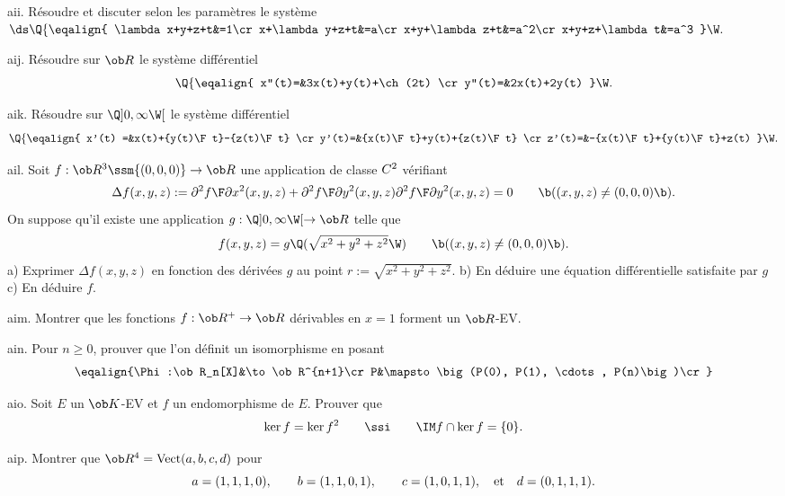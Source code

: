 \exo [Level=1,Fight=1,Learn=1,Field=\DimensionFinie,Type=\Exercices,Origin=]  aii. 
Résoudre et discuter selon les paramètres le système  $\ds
\Q\{\eqalign{
\lambda x+y+z+t&=1\cr
x+\lambda y+z+t&=a\cr
x+y+\lambda z+t&=a^2\cr
x+y+z+\lambda t&=a^3
}\W.$

 

\exo [Level=2,Fight=1,Learn=1,Field=\SystèmesDifférentiels,Type=\Exercices,Origin=] aij. 
Résoudre sur $\ob R$ le système différentiel 
$$ 
\Q\{\eqalign{
x''(t)=&3x(t)+y(t)+\ch (2t)
\cr
y''(t)=&2x(t)+2y(t)
}\W.
$$

\exo [Level=2,Fight=0,Learn=0,Field=\SystèmesDifférentiels,Type=\Exercices,Origin=] aik.  
Résoudre sur $\Q]0,\infty\W[$ le système différentiel 
$$
\Q\{\eqalign{
x'(t)
=&x(t)+{y(t)\F t}-{z(t)\F t}
\cr
y'(t)=&{x(t)\F t}+y(t)+{z(t)\F t}
\cr
z'(t)=&-{x(t)\F t}+{y(t)\F t}+z(t)
}\W.
$$


\exo [Level=2,Fight=2,Learn=2,Field=\EquationsAuxDérivéesPartielles,Type=\Exercices,Origin=] ail.  
Soit $f:\ob R^3\ssm\{(0,0,0)\}\to\ob R$ une application de classe $\sc C^2$ 
vérifiant 
$$ 
\Delta f(x,y,z):={\partial^2f\F\partial x^2}(x,y,z)
+{\partial^2f\F\partial y^2}(x,y,z){\partial^2f\F\partial y^2}(x,y,z)=0\qquad\b((x,y,z)\neq(0,0,0)\b). 
$$
On suppose qu'il existe une application $g:\Q]0,\infty\W[\to\ob R$ telle que 
$$
f(x,y,z)=g\Q(\sqrt{x^2+y^2+z^2}\W)\qquad\b((x,y,z)\neq(0,0,0)\b).
$$
a) Exprimer $\Delta f(x,y,z)$ en fonction des dérivées $g$ au point $r:=\sqrt{x^2+y^2+z^2}$. 
\smallskip\noindent
b) En déduire une équation différentielle satisfaite par $g$
\smallskip\noindent
c) En déduire $f$. 

\exo [Level=1,Fight=0,Learn=0,Origin=\Lakedaemon,Type=\Cours,Field=\EspacesVectoriels]  aim. 
Montrer que les fonctions $f:\ob R^+\to\ob R$ dérivables en $x=1$ forment un $\ob R$-EV. 

\exo [Origin=,Level=1,Fight=2,Learn=2,Type=\Exercices,Field=\Polynômes|\EspacesVectoriels|\DimensionFinie] ain. 
Pour $n\ge0$, prouver que l'on définit un isomorphisme  en posant 
$$
\eqalign{\Phi:\ob R_n[X]&\to\ob R^{n+1}\cr P&\mapsto\big(P(0), P(1), \cdots, P(n)\big)\cr}
$$

\exo [Origin=,Level=1,Fight=1,Learn=1,Type=\TravauxDirigés,Field=\EspacesVectoriels] aio. 
Soit $E$ un $\ob K$-EV et $f$ un endomorphisme de $E$. Prouver que
$$
\ker f=\ker f^2\qquad \ssi\qquad \IM f\cap\ker f=\{0\}.
$$


\exo [Origin=,Level=1,Fight=1,Learn=1,Type=\TravauxDirigés,Field=\EspacesVectoriels|\DimensionFinie] aip. 
Montrer que $\ob R^4=\mbox{Vect}(a,b,c,d)$ pour 
$$
a=(1,1,1,0), \qquad b=(1,1,0,1), \qquad c=(1,0,1,1), \quad \hbox{et}\quad d=(0,1,1,1).
$$


